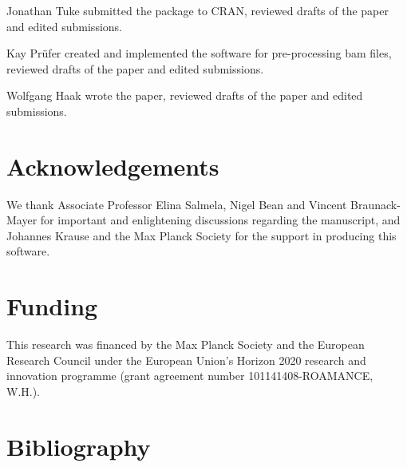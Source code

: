 \documentclass[
  letterpaper,
  DIV=11,
  numbers=noendperiod]{scrartcl}
\begin{document}
Jonathan Tuke submitted the package to CRAN, reviewed drafts of the
paper and edited submissions.

Kay Prüfer created and implemented the software for pre-processing bam
files, reviewed drafts of the paper and edited submissions.

Wolfgang Haak wrote the paper, reviewed drafts of the paper and edited
submissions.

\section{Acknowledgements}\label{acknowledgements}

We thank Associate Professor Elina Salmela, Nigel Bean and Vincent
Braunack-Mayer for important and enlightening discussions regarding the
manuscript, and Johannes Krause and the Max Planck Society for the
support in producing this software.

\section{Funding}\label{funding}

This research was financed by the Max Planck Society and the European
Research Council under the European Union's Horizon 2020 research and
innovation programme (grant agreement number 101141408-ROAMANCE, W.H.).

\section*{Bibliography}\label{bibliography}
\end{document}
